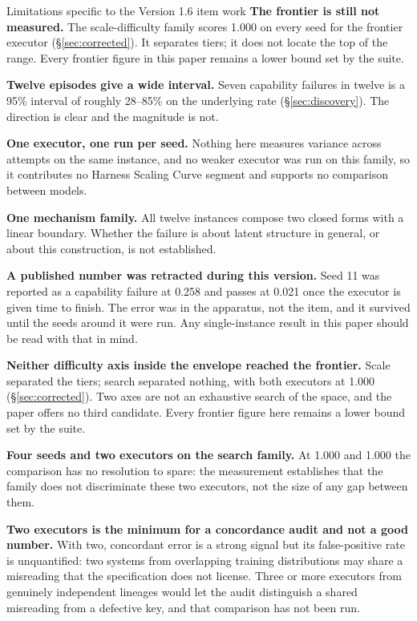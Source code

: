 \documentclass[11pt]{article}
\theoremstyle{definition}
\begin{document}
\begin{cautionbox}{Limitations specific to the Version 1.6 item work}
\textbf{The frontier is still not measured.} The scale-difficulty family scores 1.000 on every seed for the frontier executor (\S\ref{sec:corrected}). It separates tiers; it does not locate the top of the range. Every frontier figure in this paper remains a lower bound set by the suite.

\textbf{Twelve episodes give a wide interval.} Seven capability failures in twelve is a 95\% interval of roughly 28--85\% on the underlying rate (\S\ref{sec:discovery}). The direction is clear and the magnitude is not.

\textbf{One executor, one run per seed.} Nothing here measures variance across attempts on the same instance, and no weaker executor was run on this family, so it contributes no Harness Scaling Curve segment and supports no comparison between models.

\textbf{One mechanism family.} All twelve instances compose two closed forms with a linear boundary. Whether the failure is about latent structure in general, or about this construction, is not established.

\textbf{A published number was retracted during this version.} Seed 11 was reported as a capability failure at 0.258 and passes at 0.021 once the executor is given time to finish. The error was in the apparatus, not the item, and it survived until the seeds around it were run. Any single-instance result in this paper should be read with that in mind.

\textbf{Neither difficulty axis inside the envelope reached the frontier.} Scale separated the tiers; search separated nothing, with both executors at 1.000 (\S\ref{sec:corrected}). Two axes are not an exhaustive search of the space, and the paper offers no third candidate. Every frontier figure here remains a lower bound set by the suite.

\textbf{Four seeds and two executors on the search family.} At 1.000 and 1.000 the comparison has no resolution to spare: the measurement establishes that the family does not discriminate these two executors, not the size of any gap between them.

\textbf{Two executors is the minimum for a concordance audit and not a good number.} With two, concordant error is a strong signal but its false-positive rate is unquantified: two systems from overlapping training distributions may share a misreading that the specification does not license. Three or more executors from genuinely independent lineages would let the audit distinguish a shared misreading from a defective key, and that comparison has not been run.


\end{cautionbox}
\end{document}
